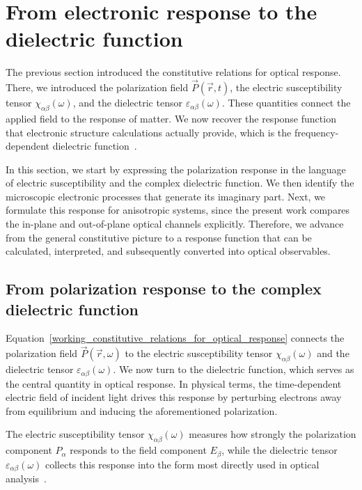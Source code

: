 \newpage
\FloatBarrier
\section{From electronic response to the dielectric function}
\label{sec:from_electronic_response_to_dielectric_function}

The previous section introduced the constitutive relations for optical response.
There, we introduced the polarization field $\vec{P}(\vec{r},t)$,
the electric susceptibility tensor $\chi_{\alpha\beta}(\omega)$,
and the dielectric tensor $\varepsilon_{\alpha\beta}(\omega)$.
These quantities connect the applied field to the response of matter.
We now recover the response function that electronic structure calculations actually provide,
which is the frequency-dependent dielectric function~\cite{onida2002electronic,gajdovs2006linear,ambrosch2006linear}.

In this section, we start by expressing the polarization response in the language of electric susceptibility and the complex dielectric function.
We then identify the microscopic electronic processes that generate its imaginary part.
Next, we formulate this response for anisotropic systems,
since the present work compares the in-plane and out-of-plane optical channels explicitly.
Therefore, we advance from the general constitutive picture to a response function that can be calculated, interpreted, and subsequently converted into optical observables.

\FloatBarrier
\subsection{From polarization response to the complex dielectric function}

Equation~\eqref{working_constitutive_relations_for_optical_response} connects the polarization field $\vec{P}(\vec{r},\omega)$ to the electric susceptibility tensor $\chi_{\alpha\beta}(\omega)$
and the dielectric tensor $\varepsilon_{\alpha\beta}(\omega)$.
We now turn to the dielectric function, which serves as the central quantity in optical response. 
In physical terms, the time-dependent electric field of incident light drives this response by perturbing electrons away from equilibrium and inducing the aforementioned polarization.

The electric susceptibility tensor $\chi_{\alpha\beta}(\omega)$ measures how strongly the polarization component $P_\alpha$ responds to the field component $E_\beta$, while the dielectric tensor $\varepsilon_{\alpha\beta}(\omega)$ collects this response into the form most directly used in optical analysis~\cite{gajdovs2006linear}.

